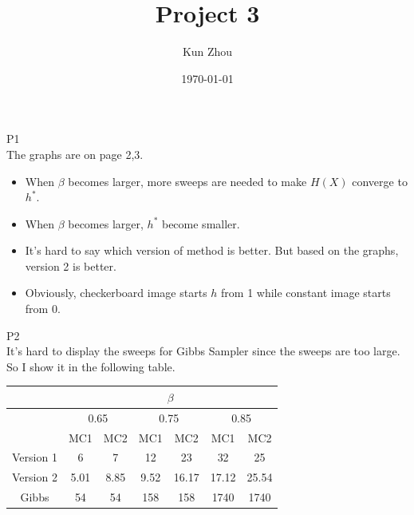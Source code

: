 \documentclass[12pt, oneside]{article}   	%
\begin{document}
\title{Project 3}
\author{Kun Zhou}
\date{\today}
\maketitle
P1\\
The graphs are on page 2,3.
\begin{itemize}
  \item When $\beta$ becomes larger, more sweeps are needed to make $H(X)$ converge to $h^*$.
  \item When $\beta$ becomes larger, $h^*$ become smaller.
  \item It's hard to say which version of method is better. But based on the graphs, version 2 is better.
  \item Obviously, checkerboard image starts $h$ from 1 while constant image starts from $0$.
\end{itemize}
P2\\
It's hard to display the sweeps for Gibbs Sampler since the sweeps are too large. So I show it in the following table.
\begin{table}
\center
\begin{tabular}{|ccccccc|}
  \hline
   & \multicolumn{6}{c|}{$\beta$} \\ \hline
   & \multicolumn{2}{c}{0.65} & \multicolumn{2}{c}{0.75} & \multicolumn{2}{c|}{0.85} \\
   & MC1 & MC2 &MC1 & MC2 &MC1 & MC2 \\\hline
   Version 1 & 6 & 7 & 12 & 23 & 32 & 25\\
   Version 2 & 5.01 & 8.85 & 9.52 & 16.17 & 17.12 & 25.54 \\
   Gibbs & 54 & 54 & 158 & 158 & 1740 & 1740\\
  \hline
\end{tabular}
\end{table}
\end{document}
